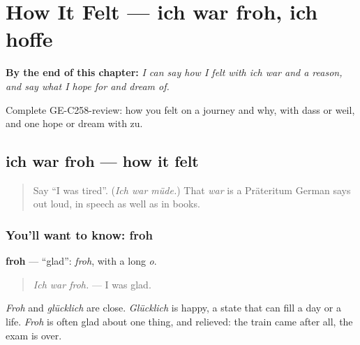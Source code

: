 
\chapter{How It Felt — ich war froh, ich hoffe}
\label{ch:ge-how-it-felt}

\begin{chapteropening}
\textbf{By the end of this chapter:} \emph{I can say how I felt with ich war and a reason, and say what I hope for and dream of.}

Complete GE-C258-review: how you felt on a journey and why, with dass or weil, and one hope or dream with zu.
\end{chapteropening}

\section[ich war froh, dass …]{ich war froh — how it felt}

\label{lesson:GE-C258-ich-war-froh}



\begin{quote}
Say \textquotedblleft{}I was tired\textquotedblright{}. (\emph{Ich war müde.}) That \emph{war} is a Präteritum German says out loud, in speech as well as in books.
\end{quote}

\subsection*{You'll want to know: froh}
\textbf{froh} — \textquotedblleft{}glad\textquotedblright{}: \emph{froh}, with a long \emph{o}.

\begin{quote}
\emph{Ich war froh.} — I was glad.
\end{quote}

\emph{Froh} and \emph{glücklich} are close. \emph{Glücklich} is happy, a state that can fill a day or a life. \emph{Froh} is often glad about one thing, and relieved: the train came after all, the exam is over.

